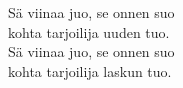 
Sä viinaa juo, se onnen suo \\ kohta tarjoilija uuden tuo. \\ Sä viinaa juo, se onnen suo \\ kohta tarjoilija laskun tuo.